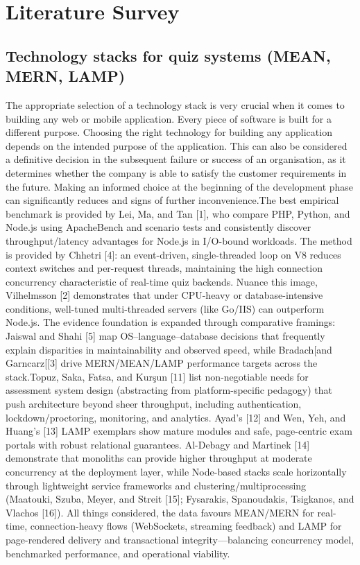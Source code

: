 \chapter{Literature Survey}
\section{Technology stacks for quiz systems (MEAN, MERN, LAMP)}

The appropriate selection of a technology stack is very crucial when it comes to building any web or mobile application. Every piece of software is built for a different purpose. Choosing the right technology for building any application depends on the intended purpose of the application. This can also be considered a definitive decision in the subsequent failure or success of an organisation, as it determines whether the company is able to satisfy the customer requirements in the future. Making an informed choice at the beginning of the development phase can significantly reduces and signs of further inconvenience.The best empirical benchmark is provided by Lei, Ma, and Tan [1], who compare PHP, Python, and Node.js using ApacheBench and scenario tests and consistently discover throughput/latency advantages for Node.js in I/O-bound workloads. The method is provided by Chhetri [4]: an event-driven, single-threaded loop on V8 reduces context switches and per-request threads, maintaining the high connection concurrency characteristic of real-time quiz backends. Nuance this image, Vilhelmsson [2] demonstrates that under CPU-heavy or database-intensive conditions, well-tuned multi-threaded servers (like Go/IIS) can outperform Node.js. The evidence foundation is expanded through comparative framings: Jaiswal and Shahi [5] map OS–language–database decisions that frequently explain disparities in maintainability and observed speed, while Bradach[and Garncarz[[3] drive MERN/MEAN/LAMP performance targets across the stack.Topuz, Saka, Fatsa, and Kurşun [11] list non-negotiable needs for assessment system design (abstracting from platform-specific pedagogy) that push architecture beyond sheer throughput, including authentication, lockdown/proctoring, monitoring, and analytics. Ayad's [12] and Wen, Yeh, and Huang's [13] LAMP exemplars show mature modules and safe, page-centric exam portals with robust relational guarantees. Al-Debagy and Martinek [14] demonstrate that monoliths can provide higher throughput at moderate concurrency at the deployment layer, while Node-based stacks scale horizontally through lightweight service frameworks and clustering/multiprocessing (Maatouki, Szuba, Meyer, and Streit [15]; Fysarakis, Spanoudakis, Tsigkanos, and Vlachos [16]). All things considered, the data favours MEAN/MERN for real-time, connection-heavy flows (WebSockets, streaming feedback) and LAMP for page-rendered delivery and transactional integrity—balancing concurrency model, benchmarked performance, and operational viability.

